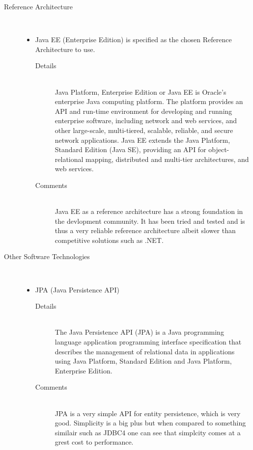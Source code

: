 \documentclass[10pt]{article}
\begin{document}
\begin{description}
		\item[Reference Architecture] \hfill \\
		 	 \begin{itemize}	
				\item Java EE (Enterprise Edition) is specified as the chosen Reference Architecture to use.
					\begin{description}
						\item[Details] \hfill \\
							Java Platform, Enterprise Edition or Java EE is Oracle's enterprise Java computing platform. The platform provides an
							 API and run-time environment for developing and running enterprise software, including network and web services, and
							 other large-scale, multi-tiered, scalable, reliable, and secure network applications. Java EE extends the Java Platform, 
							Standard Edition (Java SE),  providing an API for object-relational mapping, distributed and multi-tier architectures, and
							 web services. 
						\item[Comments]\hfill \\	
							Java EE as a reference architecture has a strong foundation in the devlopment community. It has been tried and tested
							and is thus a very reliable reference architecture albeit slower than competitive solutions such as .NET.							
					\end{description}
			\end{itemize}
		\item[Other Software Technologies] \hfill \\
			\begin{itemize}
				\item JPA (Java Persistence API)
					\begin{description}
						\item[Details] \hfill \\
							The Java Persistence API (JPA) is a Java programming language application programming interface specification that
							 describes the management of relational data in applications using Java Platform, Standard Edition and Java Platform, Enterprise Edition.
						\item[Comments]\hfill \\
							JPA is a very simple API for entity persistence, which is very good. Simplicity is a big plus but when compared to something similair such as JDBC4
							one can see that simplcity comes at a grest cost to performance. 

\end{description}
\end{itemize}
\end{description}
\end{document}
